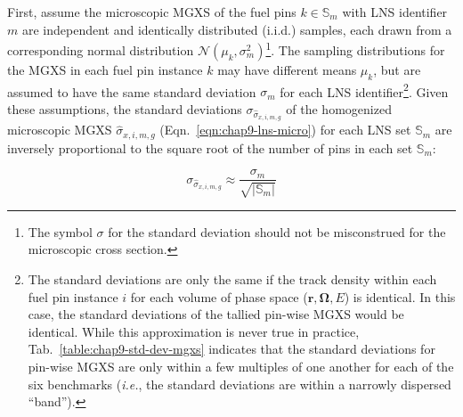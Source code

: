 First, assume the microscopic \ac{MGXS} of the fuel pins $k \in \mathbb{S}_{m}$ with \ac{LNS} identifier $m$ are independent and identically distributed (i.i.d.) samples, each drawn from a corresponding normal distribution $\mathcal{N}(\mu_{k}, \sigma_{m}^2)$\footnote{The symbol $\sigma$ for the standard deviation should not be misconstrued for the microscopic cross section.}. The sampling distributions for the \ac{MGXS} in each fuel pin instance $k$ may have different means $\mu_{k}$, but are assumed to have the same standard deviation $\sigma_{m}$ for each \ac{LNS} identifier\footnote{The standard deviations are only the same if the track density within each fuel pin instance $i$ for each volume of phase space ($\mathbf{r},\mathbf{\Omega},E$) is identical. In this case, the standard deviations of the tallied pin-wise \ac{MGXS} would be identical. While this approximation is never true in practice, Tab.~\ref{table:chap9-std-dev-mgxs} indicates that the standard deviations for pin-wise \ac{MGXS} are only within a few multiples of one another for each of the six benchmarks (\textit{i.e.}, the standard deviations are within a narrowly dispersed ``band'').}. Given these assumptions, the standard deviations $\sigma_{\hat{\sigma}_{x,i,m,g}}$ of the homogenized microscopic \ac{MGXS} $\hat{\sigma}_{x,i,m,g}$ (Eqn.~\ref{eqn:chap9-lns-micro}) for each \ac{LNS} set $\mathbb{S}_{m}$  are inversely proportional to the square root of the number of pins in each set $\mathbb{S}_{m}$:

\begin{equation}
\label{eqn:chap9-homogenize-std-dev}
\sigma_{\hat{\sigma}_{x,i,m,g}} \approx \frac{\sigma_{m}}{\sqrt{|\mathbb{S}_{m}|}}
\end{equation}

